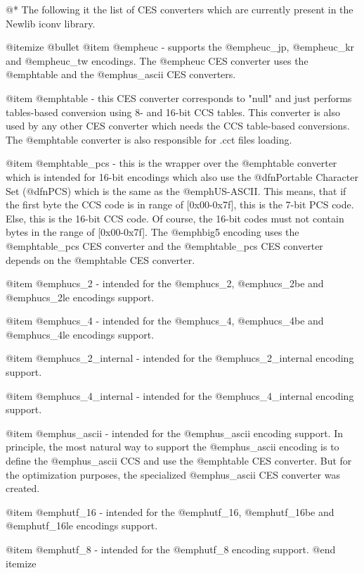 @*
The following it the list of CES converters which are currently present
in the Newlib iconv library.

@itemize @bullet
@item
@emph{euc} - supports the @emph{euc_jp}, @emph{euc_kr} and @emph{euc_tw}
encodings. The @emph{euc} CES converter uses the @emph{table} and the
@emph{us_ascii} CES converters.

@item
@emph{table} - this CES converter corresponds to "null" and just performs 
tables-based conversion using 8- and 16-bit CCS tables. This converter
is also used by any other CES converter which needs the CCS table-based
conversions. The @emph{table} converter is also responsible for .cct files
loading.

@item
@emph{table_pcs} - this is the wrapper over the @emph{table} converter
which is intended for 16-bit encodings which also use the @dfn{Portable
Character Set} (@dfn{PCS}) which is the same as the @emph{US-ASCII}.
This means, that if the first byte the CCS code is in range of [0x00-0x7f],
this is the 7-bit PCS code. Else, this is the 16-bit CCS code. Of course,
the 16-bit codes must not contain bytes in the range of [0x00-0x7f].
The @emph{big5} encoding uses the @emph{table_pcs} CES converter and the
@emph{table_pcs} CES converter depends on the @emph{table} CES converter.

@item
@emph{ucs_2} - intended for the @emph{ucs_2}, @emph{ucs_2be} and
@emph{ucs_2le} encodings support.

@item
@emph{ucs_4} - intended for the @emph{ucs_4}, @emph{ucs_4be} and
@emph{ucs_4le} encodings support.

@item
@emph{ucs_2_internal} - intended for the @emph{ucs_2_internal} encoding support.

@item
@emph{ucs_4_internal} - intended for the @emph{ucs_4_internal} encoding support.

@item
@emph{us_ascii} - intended for the @emph{us_ascii} encoding support. In
principle, the most natural way to support the @emph{us_ascii} encoding
is to define the @emph{us_ascii} CCS and use the @emph{table} CES
converter. But for the optimization purposes, the specialized
@emph{us_ascii} CES converter was created.

@item
@emph{utf_16} - intended for the @emph{utf_16}, @emph{utf_16be} and
@emph{utf_16le} encodings support.

@item
@emph{utf_8} - intended for the @emph{utf_8} encoding support.
@end itemize





